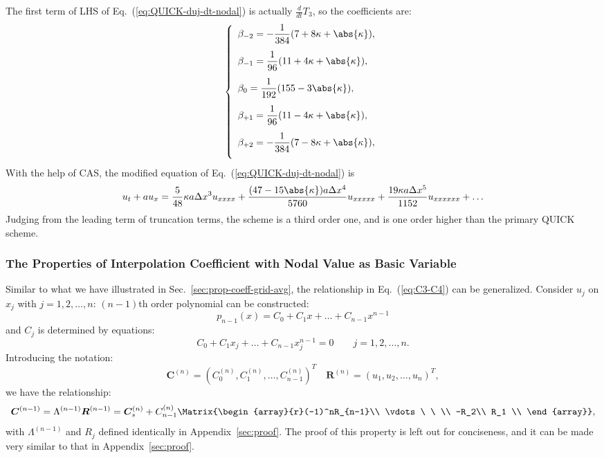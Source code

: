 \documentclass[]{article}
\begin{document}
The first term of LHS of Eq.~(\ref{eq:QUICK-duj-dt-nodal}) is actually
$\frac{d}{dt}T_3$, so the coefficients are:
\[
\left\{\begin{array}{l}
\displaystyle
\beta_{-2} = -\frac{1}{384} (7+8\kappa+\abs{\kappa}),\\[4mm]
\displaystyle
\beta_{-1} = \frac{1}{96} (11+4\kappa+\abs{\kappa}),\\[4mm]
\displaystyle
\beta_{0} = \frac{1}{192} (155-3\abs{\kappa}),\\[4mm]
\displaystyle
\beta_{+1} = \frac{1}{96} (11-4\kappa+\abs{\kappa}),\\[4mm]
\displaystyle
\beta_{+2} = -\frac{1}{384} (7-8\kappa+\abs{\kappa}),\\[4mm]
\end{array}\right.
\]
With the help of CAS, the modified equation of Eq.~(\ref{eq:QUICK-duj-dt-nodal})
is
\[
    u_t+au_x=\frac{5}{48}\kappa a\Delta x^3 u_{xxxx} +
    \frac{(47-15\abs{\kappa})a\Delta x^4 }{5760}u_{xxxxx} + \frac{19\kappa
    a\Delta x^5}{1152}u_{xxxxxx}+\ldots
\]
Judging from the leading term of truncation terms, the scheme is a third order
one, and is one order higher than the primary QUICK scheme.

\subsubsection{The Properties of Interpolation Coefficient with Nodal Value as Basic Variable}\label{sec:prop-coeff-nodal-value}
Similar to what we have illustrated in Sec.~\ref{sec:prop-coeff-grid-avg}, the
relationship in Eq.~(\ref{eq:C3-C4}) can be generalized. Consider $u_j$ on
$x_j$ with $j=1,2,\dots,n$: $(n-1)$th order polynomial can be constructed:
\[
    p_{n-1}(x) = C_0 + C_1 x + \dots + C_{n-1} x^{n-1}
\]
and $C_j$ is determined by equations:
\[
    C_0 + C_1 x_j + \dots + C_{n-1}x_j^{n-1} = 0\qquad j=1,2,\dots,n.
\]
Introducing the notation:
\[
    \bm C^{(n)} = (C_0^{(n)}, C_1^{(n)}, \dots, C_{n-1}^{(n)})^T \quad
    \bm R^{(n)} = (u_1, u_2, \dots, u_n)^T,
\]
we have the relationship:
\[
\bm C^{(n-1)}=\Lambda^{(n-1)}\bm R^{(n-1)}=\bm C^{(n)}_s +
C^{(n)}_{n-1}\Matrix{\begin{array}{r}(-1)^nR_{n-1}\\ \vdots\ \ \\ -R_2\\ R_1 \\
\end{array}},
\]
with $\Lambda^{(n-1)}$ and $R_j$ defined identically in
Appendix~\ref{sec:proof}. The proof of this property is left out for
conciseness, and it can be made very similar to that in
Appendix~\ref{sec:proof}.
\end{document}
